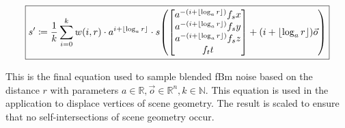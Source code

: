 \begin{equation}\label{eq:fbm5}
    \boxed{
        s' \coloneqq \frac{1}{k} \sum_{i=0}^{k} w(i, r) \cdot a^{i + \lfloor \log_a r \rfloor} \cdot s\mleft(\begin{bmatrix}a^{-(i + \lfloor \log_a r \rfloor)}f_sx\\a^{-(i + \lfloor \log_a r \rfloor)}f_sy\\a^{-(i + \lfloor \log_a r \rfloor)}f_sz\\f_tt\end{bmatrix} + (i + \lfloor \log_a r \rfloor) \vec{o}\mright)
    }
\end{equation}

This is the final equation used to sample blended \ac{fBm} noise based on the distance $r$ with parameters $a \in \mathbb{R}, \vec{o} \in \mathbb{R}^n, k \in \mathbb{N}$. This equation is used in the application to displace vertices of scene geometry. The result is scaled to ensure that no self-intersections of scene geometry occur.

